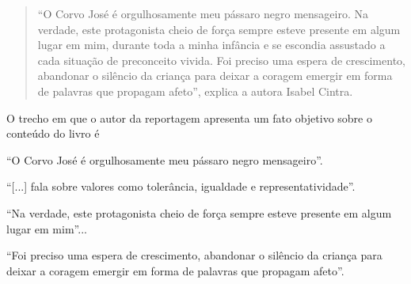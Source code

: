 \begin{escolha}
\begin{escolha}
\begin{escolha}
{{\begin{quote}
``O Corvo José é orgulhosamente meu pássaro negro mensageiro. Na
verdade, este protagonista cheio de força sempre esteve presente em
algum lugar em mim, durante toda a minha infância e se escondia
assustado a cada situação de preconceito vivida. Foi preciso uma espera
de crescimento, abandonar o silêncio da criança para deixar a coragem
emergir em forma de palavras que propagam afeto'', explica a autora
Isabel Cintra.

\end{quote}

O trecho em que o autor da reportagem apresenta um fato objetivo sobre
o conteúdo do livro é

\begin{escolha}
\item ``O Corvo José é orgulhosamente meu pássaro negro mensageiro''.

\item ``{[}...{]} fala sobre
valores como tolerância, igualdade e representatividade''.

\item ``Na verdade, este protagonista cheio de força sempre esteve
presente em algum lugar em mim''...

\item ``Foi preciso uma espera de crescimento, abandonar o silêncio da
criança para deixar a coragem emergir em forma de palavras que propagam
afeto''.
\end{escolha}


}}
\end{escolha}
\end{escolha}
\end{escolha}
